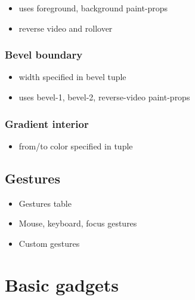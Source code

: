 \documentclass{book}
\begin{document}
\begin{itemize}

\item uses foreground, background paint-props

\item reverse video and rollover

\end{itemize}

\subsubsection{Bevel boundary}

\begin{itemize}

\item width specified in bevel tuple

\item uses bevel-1, bevel-2, reverse-video paint-props

\end{itemize}

\subsubsection{Gradient interior}

\begin{itemize}

\item from/to color specified in tuple

\end{itemize}

\subsection{Gestures}

\begin{itemize}

\item Gestures table

\item Mouse, keyboard, focus gestures

\item Custom gestures

\end{itemize}

\section{Basic gadgets}
\end{document}
